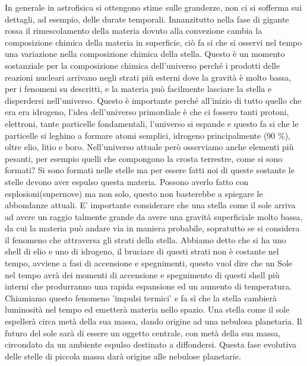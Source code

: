 \documentclass[a4paper,11pt]{article}
\begin{document}
    In generale in astrofisica si ottengono stime sulle grandezze, non ci si sofferma sui dettagli, ad esempio, delle durate temporali. Innanzitutto nella fase di gigante rossa il rimescolamento della materia dovuto alla convezione cambia la composizione chimica della materia in superficie, ciò fa si che si osservi nel tempo una variazione nella composizione chimica della stella. Questo è un momento sostanziale per la composizione chimica dell'universo perché i prodotti delle reazioni nucleari arrivano negli strati più esterni dove la gravità è molto bassa, per i fenomeni su descritti, e la materia può facilmente lasciare la stella e disperdersi nell'universo. Questo è importante perché all'inizio di tutto quello che era era idrogeno, l'idea dell'universo primordiale è che ci fossero tanti protoni, elettroni, tante particelle fondamentali, l'universo si espande e questo fa si che le particelle si leghino a formare atomi semplici, idrogeno principalmente (90 \%), oltre elio, litio e boro. Nell'universo attuale però osserviamo anche elementi più pesanti, per esempio quelli che compongono la crosta terrestre, come si sono formati? Si sono formati nelle stelle ma per essere fatti noi di queste sostante le stelle devono aver espulso questa materia. Possono averlo fatto con esplosioni(supernove) ma non solo, questo non basterebbe a spiegare le abbondanze attuali. E' importante considerare che una stella come il sole arriva ad avere un raggio talmente grande da avere una gravità superficiale molto bassa, da cui la materia può andare via in maniera probabile, sopratutto se si considera il fenomeno che attraversa gli strati della stella. Abbiamo detto che si ha uno shell di elio e uno di idrogeno, il bruciare di questi strati non è costante nel tempo, avviene a fasi di accensione e spegnimenti, questo vuol dire che un Sole nel tempo avrà dei momenti di accensione e spegnimento di questi shell più interni che produrranno una rapida espansione ed un aumento di temperatura. Chiamiamo questo fenomeno 'impulsi termici' e fa sì che la stella cambierà luminosità nel tempo ed emetterà materia nello spazio. Una stella come il sole espellerà circa metà della sua massa, dando origine ad una nebulosa planetaria. Il futuro del sole sarà di essere un oggetto centrale, con metà della sua massa, circondato da un ambiente espulso destinato a diffondersi. Questa fase evolutiva delle stelle di piccola massa darà origine alle nebulose planetarie. 
\end{document}
